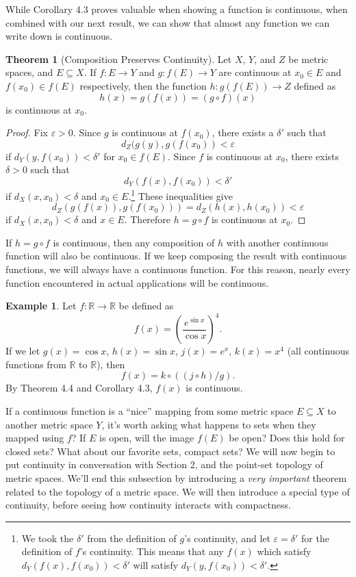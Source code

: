 \documentclass{article}
\newcommand{\R}{\mathbb{R}}
\theoremstyle{definition}
\newtheorem{theorem}{Theorem}[section]
\newtheorem{example}{Example}[section]
\begin{document}
	While Corollary 4.3 proves valuable when showing a function is continuous, when combined with our next result, we can show that almost any function we can write down is continuous.  
	\begin{theorem}[Composition Preserves Continuity]
		Let $ X $, $ Y $, and $ Z $ be metric spaces, and $ E\subseteq X $. If $ f:E\to Y $ and $ g:f(E)\to Y $ are continuous at $ x_0\in E $ and $ f(x_0)\in f(E) $ respectively, then the function $ h:g(f(E))\to Z $ defined as  $$ h(x)=g(f(x))=(g\circ f)(x)$$ is continuous at $ x_0 $. 
	\end{theorem}
	\begin{proof}
		Fix $ \varepsilon>0 $. Since $ g $ is continuous at $ f(x_0) $, there exists a $ \delta' $ such that $$d_Z(g(y),g(f(x_0))<\varepsilon $$ if $ d_Y(y,f(x_0))<\delta' $ for $ x_0\in f(E) $. Since $ f $ is continuous at $ x_0 $, there exists $ \delta>0 $ such that $$d_Y(f(x),f(x_0))<\delta' $$ if $ d_X(x,x_0)<\delta $ and $ x_0\in E $.\footnote{We took the $ \delta' $ from the definition of $ g $'s continuity, and let $ \varepsilon=\delta' $ for the definition of $ f $'s continuity. This means that any $ f(x) $ which satisfy $ d_Y(f(x),f(x_0))<\delta'  $ will satisfy $ d_Y(y,f(x_0))<\delta' $.} These inequalities give $$d_Z(g(f(x)),g(f(x_0)))=d_Z(h(x),h(x_0))<\varepsilon $$ if $ d_X(x,x_0)<\delta $ and $ x\in E $. Therefore $ h=g\circ f $ is continuous at $ x_0 $. 
	\end{proof}
	If $ h=g\circ f $ is continuous, then any composition of $ h $ with another continuous function will also be continuous. If we keep composing the result with continuous functions, we will always have a continuous function. For this reason, nearly every function encountered in actual applications will be continuous.   
	\begin{example}
		Let $ f:\R\to\R $ be defined as $$ f(x)=\left(\frac{e^{\sin x}}{\cos x}\right)^4 .$$ If we let $ g(x)=\cos x $, $ h(x)=\sin  x $, $ j(x)=e^x $, $ k(x)=x^4 $ (all continuous functions from $ \R $ to $ \R $), then $$f(x)=k\circ((j\circ h)/g).$$ By Theorem 4.4 and Corollary 4.3, $ f(x) $ is continuous. 
	\end{example}
	If a continuous function is a ``nice'' mapping from some metric space $ E\subseteq X $ to another metric space $ Y $, it's worth asking what happens to sets when they mapped using $ f $? If $ E $ is open, will the image $ f(E) $ be open? Does this hold for closed sets? What about our favorite sets, compact sets? We will now begin to put continuity in conversation with Section 2, and the point-set topology of metric spaces. We'll end this subsection by introducing a \textit{very important} theorem related to the topology of a metric space. We will then introduce a special type of continuity, before seeing how continuity interacts with compactness.
\end{document}
